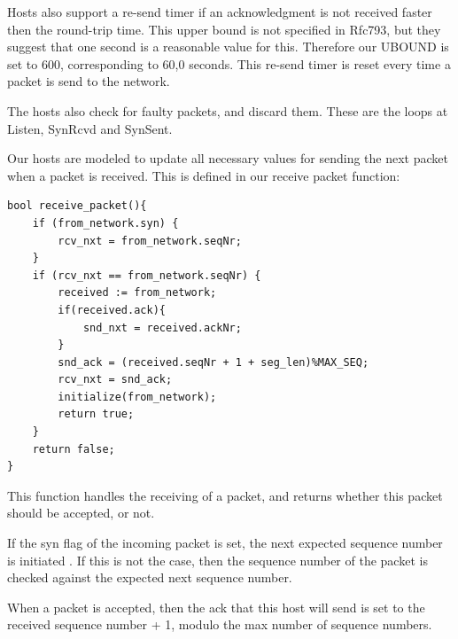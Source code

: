 \documentclass[twocolumn]{article}
\begin{document}
Hosts also support a re-send timer if an acknowledgment is not received faster then the round-trip time. This upper bound is not specified in Rfc793, but they suggest that one second is a reasonable value for this. Therefore our UBOUND is set to 600, corresponding to 60,0 seconds. This re-send timer is reset every time a packet is send to the network.

The hosts also check for faulty packets, and discard them. These are the loops at Listen, SynRcvd and SynSent. 

Our hosts are modeled to update all necessary values for sending the next packet when a packet is received. This is defined in our receive packet function:
\begin{verbatim}
bool receive_packet(){
	if (from_network.syn) {
		rcv_nxt = from_network.seqNr;
	}
	if (rcv_nxt == from_network.seqNr) {
		received := from_network;
		if(received.ack){
			snd_nxt = received.ackNr;
		}
		snd_ack = (received.seqNr + 1 + seg_len)%MAX_SEQ;
		rcv_nxt = snd_ack;
		initialize(from_network);
		return true;
	}
	return false;
}
\end{verbatim}

This function handles the receiving of a packet, and returns whether this packet should be accepted, or not.

If the syn flag of the incoming packet is set, the next expected sequence number is initiated . If this is not the case, then the sequence number of the packet is checked against the expected next sequence number.

When a packet is accepted, then the ack that this host will send is set to the received sequence number + 1, modulo the max number of sequence numbers.
\end{document}
